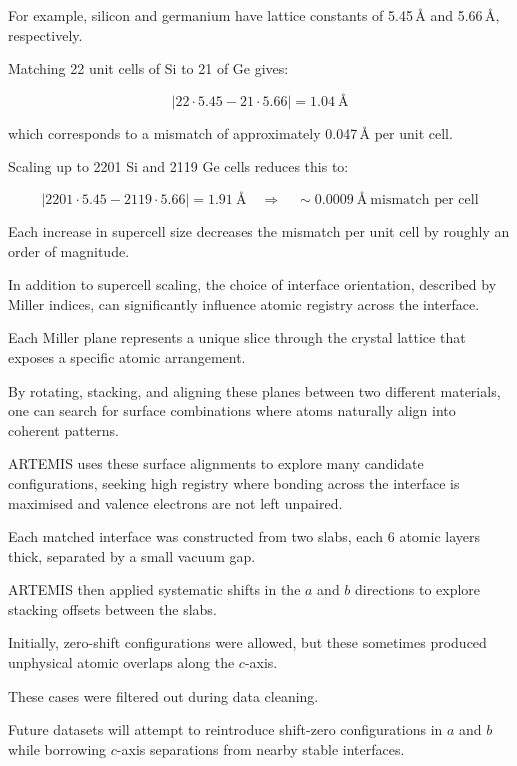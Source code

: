 For example, silicon and germanium have lattice constants of 5.45\,\AA{} and 5.66\,\AA{}, respectively.

Matching 22 unit cells of Si to 21 of Ge gives:


\[
|22 \cdot 5.45 - 21 \cdot 5.66| = 1.04~\text{\AA}
\]


which corresponds to a mismatch of approximately 0.047\,\AA{} per unit cell.

Scaling up to 2201 Si and 2119 Ge cells reduces this to:


\[
|2201 \cdot 5.45 - 2119 \cdot 5.66| = 1.91~\text{\AA} \quad \Rightarrow \quad \sim 0.0009~\text{\AA}~\text{mismatch per cell}
\]


Each increase in supercell size decreases the mismatch per unit cell by roughly an order of magnitude.


In addition to supercell scaling, the choice of interface orientation, described by Miller indices, can significantly
influence atomic registry across the interface.

Each Miller plane represents a unique slice through the crystal lattice that exposes a specific atomic arrangement.

By rotating, stacking, and aligning these planes between two different materials, one can search for surface
combinations where atoms naturally align into coherent patterns.

ARTEMIS uses these surface alignments to explore many candidate configurations, seeking high registry where bonding
across the interface is maximised and valence electrons are not left unpaired.


Each matched interface was constructed from two slabs, each 6 atomic layers thick, separated by a small vacuum gap.

ARTEMIS then applied systematic shifts in the $a$ and $b$ directions to explore stacking offsets between the slabs.

Initially, zero-shift configurations were allowed, but these sometimes produced unphysical atomic overlaps along
the $c$-axis.

These cases were filtered out during data cleaning.

Future datasets will attempt to reintroduce shift-zero configurations in $a$ and $b$ while borrowing $c$-axis
separations from nearby stable interfaces.

